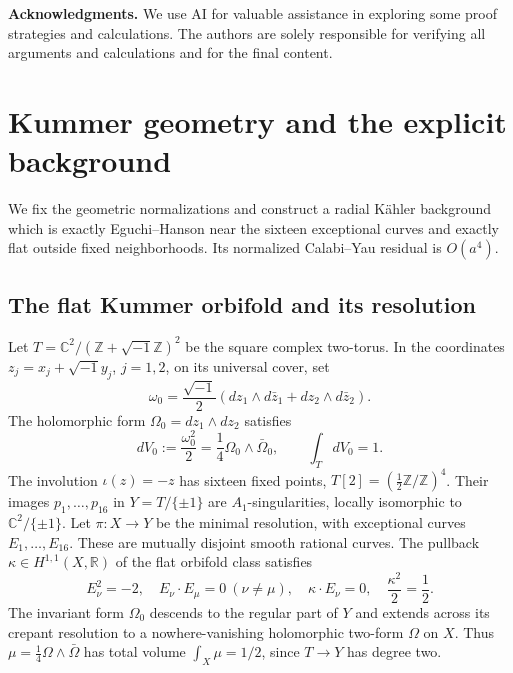 \documentclass[11pt,a4paper,twoside]{article}
\numberwithin{equation}{section}
\theoremstyle{definition}
\theoremstyle{remark}
\newcommand{\ii}{\sqrt{-1}}
\begin{document}
{\bfseries Acknowledgments.} 
We use AI for valuable assistance in exploring some proof strategies and calculations. 
The authors are solely responsible for verifying all arguments and calculations and for the final content.


\section{Kummer geometry and the explicit background}
\label{sec:kummer-geometry}
We fix the geometric normalizations and construct a radial K\"ahler
background which is exactly Eguchi--Hanson near the sixteen
exceptional curves and exactly flat outside fixed neighborhoods.
Its normalized Calabi--Yau residual is \(O(a^4)\).

\subsection{The flat Kummer orbifold and its resolution}
\label{subsec:kummer-orbifold}
Let \(T=\mathbb C^2/(\mathbb Z+\ii\mathbb Z)^2\) be the square
complex two-torus. In the coordinates \(z_j=x_j+\ii y_j\),
\(j=1,2\), on its universal cover, set
\begin{equation}\label{eq:flat-kahler-form}
\omega_0=\frac{\ii}{2}
\left(dz_1\wedge d\bar z_1+dz_2\wedge d\bar z_2\right).
\end{equation}
The holomorphic form \(\Omega_0=dz_1\wedge dz_2\) satisfies
\begin{equation}\label{eq:flat-volume-identity}
dV_0:=\frac{\omega_0^2}{2}=\frac14\Omega_0\wedge\bar\Omega_0,
\qquad \int_TdV_0=1.
\end{equation}
The involution \(\iota(z)=-z\) has sixteen fixed points,
\(T[2]=(\frac12\mathbb Z/\mathbb Z)^4\). Their images
\(p_1,\ldots,p_{16}\) in \(Y=T/\{\pm1\}\) are
\(A_1\)-singularities, locally isomorphic to
\(\mathbb C^2/\{\pm1\}\). Let \(\pi:X\to Y\) be the minimal
resolution, with exceptional curves \(E_1,\ldots,E_{16}\).
These are mutually disjoint smooth rational curves. The pullback
\(\kappa\in H^{1,1}(X,\mathbb R)\) of the flat orbifold class
satisfies
\begin{equation}\label{eq:intersection-normalizations}
E_\nu^2=-2,\quad E_\nu\cdot E_\mu=0\ (\nu\ne\mu),
\quad \kappa\cdot E_\nu=0,\quad \frac{\kappa^2}{2}=\frac12.
\end{equation}
The invariant form \(\Omega_0\) descends to the regular part
of \(Y\) and extends across its crepant resolution to a
nowhere-vanishing holomorphic two-form \(\Omega\) on \(X\).
Thus \(\mu=\frac14\Omega\wedge\bar\Omega\) has total volume
\(\int_X\mu=1/2\), since \(T\to Y\) has degree two.
\end{document}
